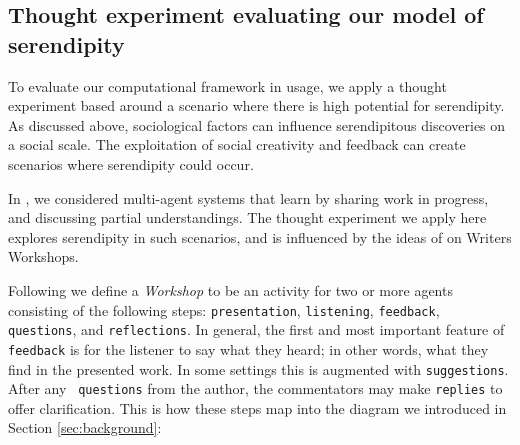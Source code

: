 \subsection{Thought experiment evaluating our model of serendipity} \label{sec:ww}

To evaluate our computational framework in usage, we apply a thought
experiment based around a scenario where there is high potential for
serendipity.  As discussed above, sociological factors can influence
serendipitous discoveries on a social scale.  The exploitation of
social creativity and feedback can create scenarios where serendipity
could occur.

In \cite{poetry-workshop}, we considered multi-agent systems that
learn by sharing work in progress, and discussing partial
understandings.  The thought experiment we apply here explores
serendipity in such scenarios, and is influenced by the ideas of
 on Writers Workshops.

Following 
we define a \emph{Workshop} to be an activity for two or more agents
consisting of the following steps:
{\tt presentation}, {\tt listening}, {\tt feedback}, {\tt questions},
and {\tt reflections}.  In general, the first and most important
feature of {\tt feedback} is for the listener to say what they heard;
in other words, what they find in the presented work.  In some
settings this is augmented with {\tt suggestions}.  After any {\tt
  questions} from the author, the commentators may make {\tt replies}
to offer clarification.
This is how these steps map into the diagram we introduced in Section \ref{sec:background}:


